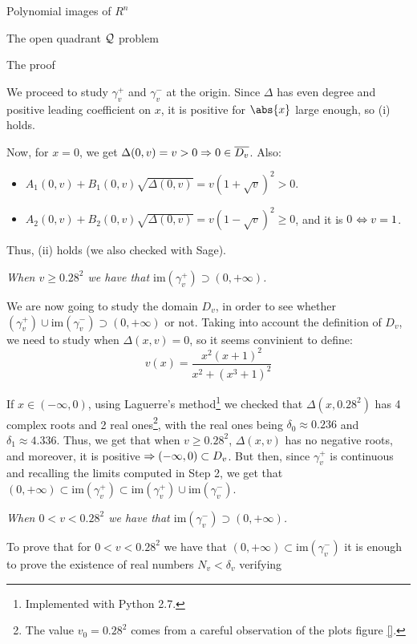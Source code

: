 \documentclass[11pt, a4paper, english, twoside, notitlepage]{report}
\begin{document}
\begin{chapter}{Polynomial images of $R^n$}
\begin{section}{The open quadrant $\mathcal{Q}$ problem}
\begin{subsection}{The proof}
\begin{Proof}
			We proceed to study $\gamma_v^+$ and $\gamma_v^-$ at the origin. Since $\Delta$ has even degree and positive leading coefficient on $x$, it is positive for $\abs{x}$ large enough, so (i) holds.
			
			Now, for $x = 0$, we get $\Delta(0, v) = v > 0 \Rightarrow 0 \in \overline{D_v}$. Also:
			\begin{itemize}
				\item $A_1(0,v) + B_1(0,v) \sqrt{\Delta(0,v)} = v(1+\sqrt{v})^2 > 0$.
				
				\item $A_2(0,v) + B_2(0,v) \sqrt{\Delta(0,v)} = v(1-\sqrt{v})^2 \geq 0$, and it is $0$ $\Leftrightarrow v = 1$.
			\end{itemize}
			Thus, (ii) holds (we also checked with Sage).

			\begin{center}
				 \emph{When $v \geq 0.28^2$ we have that $\text{im}(\gamma_v^+) \supset (0, +\infty)$.}
			\end{center}
			
			We are now going to study the domain $D_v$, in order to see whether $ (\gamma_v^+) \cup \text{im}(\gamma_v^-) \supset (0, +\infty)$ or not. Taking into account the definition of $D_v$, we need to study when $\Delta(x, v) = 0$, so it seems convinient to define:
			$$v(x)=\frac{x^2(x+1)^2}{x^2+(x^3+1)^2}$$
			
			If $x \in (-\infty, 0)$, using Laguerre's method\footnote{Implemented with Python 2.7.} we checked that $\Delta(x, 0.28^2)$ has 4 complex roots and 2 real ones\footnote{The value $v_0 = 0.28^2$ comes from a careful observation of the plots figure \ref{}.}, with the real ones being $\delta_0 \approx 0.236$ and $\delta_1 \approx 4.336$. Thus, we get that when $v \ge 0.28^2$, $\Delta(x, v)$ has no negative roots, and moreover, it is positive $\Rightarrow (-\infty, 0) \subset D_v$. But then, since $\gamma_v^+$ is continuous and recalling the limits computed in Step 2, we get that $(0, +\infty) \subset \text{im}(\gamma_v^+) \subset \text{im}(\gamma_v^+) \cup \text{im}(\gamma_v^-)$.
			
			\begin{center}
				 \emph{When $0 < v < 0.28^2$ we have that $\text{im}(\gamma_v^-) \supset (0, +\infty)$.}
			\end{center} 
			
			To prove that for $0 < v < 0.28^2$ we have that $(0, +\infty) \subset \text{im}(\gamma_v^-)$ it is enough to prove the existence of real numbers $N_v < \delta_v$ verifying
			

\end{Proof}
\end{subsection}
\end{section}
\end{chapter}
\end{document}
